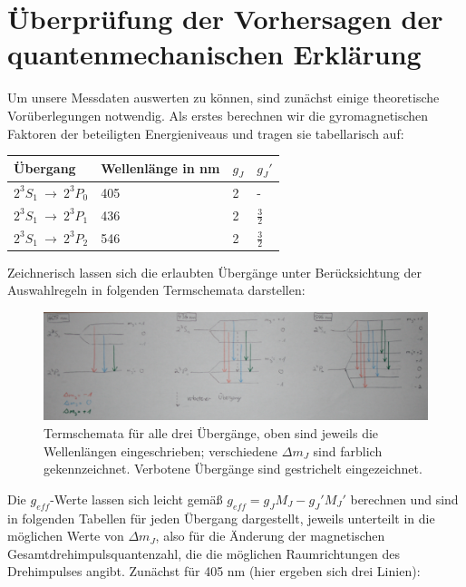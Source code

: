 \documentclass[bigchapter,colorback,accentcolor=tud4b,linedtoc,11pt]{tudreport}
\begin{document}
\section{Überprüfung der Vorhersagen der quantenmechanischen Erklärung}

Um unsere Messdaten auswerten zu können, sind zunächst einige theoretische Vorüberlegungen notwendig. Als erstes berechnen wir die gyromagnetischen Faktoren der beteiligten Energieniveaus und tragen sie tabellarisch auf: 

\begin{center}
  \begin{tabular}{|p{2.2cm}|p{4cm}|p{2cm}|p{2cm}|}
    \hline
    Übergang                    & Wellenlänge in nm & $g_J$ & $g_J'$        \\ \hline
    $2^3S_1~\rightarrow~2^3P_0$ & 405               & 2     & -             \\ \hline
    $2^3S_1~\rightarrow~2^3P_1$ & 436               & 2     & $\frac{3}{2}$ \\ \hline
    $2^3S_1~\rightarrow~2^3P_2$ & 546               & 2     & $\frac{3}{2}$ \\ \hline
	\end{tabular}
\end{center}

Zeichnerisch lassen sich die erlaubten Übergänge unter Berücksichtung der Auswahlregeln in folgenden Termschemata darstellen:

\begin{figure}[H] 
  \centering
     \includegraphics[width=1\textwidth]{data/Termschemata.JPG}
  \caption{Termschemata für alle drei Übergänge, oben sind jeweils die Wellenlängen eingeschrieben; verschiedene $\Delta m_J$ sind farblich gekennzeichnet. Verbotene Übergänge sind gestrichelt eingezeichnet.}
  \label{fig:Bild3}
\end{figure}

Die $g_{eff}$-Werte lassen sich leicht gemäß $g_{eff} = g_J M_J - g_J' M_J'$ berechnen und sind in folgenden Tabellen für jeden Übergang dargestellt, jeweils unterteilt in die möglichen Werte von $\Delta m_J$, also für die Änderung der magnetischen Gesamtdrehimpulsquantenzahl, die die möglichen Raumrichtungen des Drehimpulses angibt. Zunächst für 405 nm (hier ergeben sich drei Linien):
\end{document}
